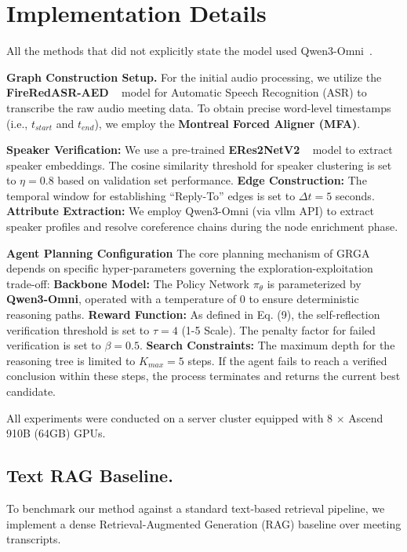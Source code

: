 \documentclass[11pt]{article}
\begin{document}
\section{Implementation Details}
\label{sec:implementation}

All the methods that did not explicitly state the model used Qwen3-Omni~\cite{Qwen3-Omni}.

\textbf{Graph Construction Setup.} For the initial audio processing, we utilize the \textbf{FireRedASR-AED} ~\cite{FireRedASR} model for Automatic Speech Recognition (ASR) to transcribe the raw audio meeting data. To obtain precise word-level timestamps (i.e., $ t_{start} $ and $ t_{end} $), we employ the \textbf{Montreal Forced Aligner (MFA)}.

\textbf{Speaker Verification:} We use a pre-trained \textbf{ERes2NetV2} ~\cite{ERes2NetV2} model to extract speaker embeddings. The cosine similarity threshold for speaker clustering is set to $ \eta = 0.8 $ based on validation set performance.
\textbf{Edge Construction:} The temporal window for establishing ``Reply-To'' edges is set to $ \Delta t = 5 $ seconds.
\textbf{Attribute Extraction:} We employ Qwen3-Omni (via vllm API) to extract speaker profiles and resolve coreference chains during the node enrichment phase.

\textbf{Agent Planning Configuration}
The core planning mechanism of GRGA depends on specific hyper-parameters governing the exploration-exploitation trade-off:
\textbf{Backbone Model:} The Policy Network $ \pi_\theta $ is parameterized by \textbf{Qwen3-Omni}, operated with a temperature of $ 0 $ to ensure deterministic reasoning paths.
\textbf{Reward Function:} As defined in Eq. (9), the self-reflection verification threshold is set to $ \tau = 4 $ (1-5 Scale). The penalty factor for failed verification is set to $ \beta = 0.5 $.
\textbf{Search Constraints:} The maximum depth for the reasoning tree is limited to $ K_{max} = 5 $ steps. If the agent fails to reach a verified conclusion within these steps, the process terminates and returns the current best candidate.

All experiments were conducted on a server cluster equipped with 8 $\times$ Ascend 910B (64GB) GPUs. 

\subsection{Text RAG Baseline.}

To benchmark our method against a standard text-based retrieval pipeline, we implement a dense Retrieval-Augmented Generation (RAG) baseline over meeting transcripts.
\end{document}
